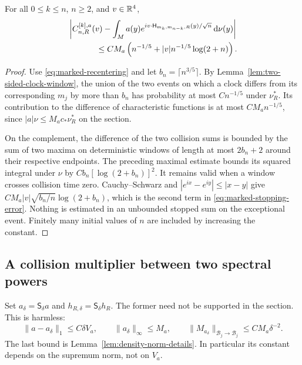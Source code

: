\begin{proposition}
\label{prop:marked-stopping}
For all $0\le k\le n$, $n\ge2$, and $v\in\mathbb R^4$,
\begin{align}
 &\left|C^{[k],a}_{n,R}(v)
  -\int_M a(y)e^{iv\cdot\mathsf H_{m_k,m_{n-k},R}(y)/\sqrt n}\dd\nu(y)
       \right|\notag\\
 &\hspace{12mm}\le C M_a\left(n^{-1/5}
             +|v|n^{-1/5}\log(2+n)\right).
       \label{eq:marked-stopping-error}
\end{align}
\end{proposition}
\begin{proof}
Use \eqref{eq:marked-recentering} and let
$b_n=\lceil n^{3/5}\rceil$. By Lemma~\ref{lem:two-sided-clock-window},
the union of the two events on which a clock differs from its
corresponding $m_j$ by more than $b_n$ has probability at most
$Cn^{-1/5}$ under $\nu_R^*$. Its contribution to the difference of
characteristic functions is at most $C M_an^{-1/5}$, since
$|a|\nu\le M_ac_*\nu_R^*$ on the section.

On the complement, the difference of the two collision sums is bounded
by the sum of two maxima on deterministic windows of length at most
$2b_n+2$ around their respective endpoints. The preceding maximal
estimate bounds its squared integral under $\nu$ by
$C b_n[\log(2+b_n)]^2$. It remains valid when a window crosses collision
time zero. Cauchy--Schwarz and $|e^{ix}-e^{iy}|\le|x-y|$ give
$C M_a|v|\sqrt{b_n/n}\log(2+b_n)$, which is the second term in
\eqref{eq:marked-stopping-error}. Nothing is estimated in an unbounded
stopped sum on the exceptional event. Finitely many initial values of
$n$ are included by increasing the constant.
\end{proof}

\subsection{A collision multiplier between two spectral powers}
Set $a_\delta=\mathsf S_\delta a$ and $h_{R,\delta}=\mathsf S_\delta h_R$.
The former need not be supported in the section. This is harmless:
\begin{equation}\label{eq:marked-smoothing-norms}
 \|a-a_\delta\|_1\le C\delta V_a,\qquad
 \|a_\delta\|_\infty\le M_a,\qquad
 \|M_{a_\delta}\|_{\mathcal B_j\to\mathcal B_j}
       \le C M_a\delta^{-2}.
\end{equation}
The last bound is Lemma~\ref{lem:density-norm-details}. In particular
its constant depends on the supremum norm, not on $V_a$.

